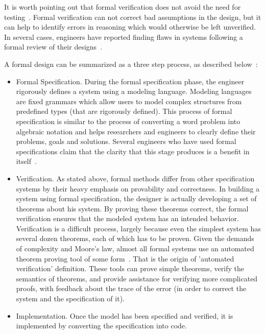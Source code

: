 It is worth pointing out that formal verification does not avoid the need for testing~\cite{Bowen95}. Formal verification can not correct bad assumptions in the design, but it can help to identify errors in reasoning which would otherwise be left unverified. In several cases, engineers have reported finding flaws in systems following a formal review of their designs~\cite{Kling95}.

A formal design can be summarized as a three step process, as described below~\cite{Collins98}:

\begin{itemize}
\item Formal Specification. During the formal specification phase, the engineer rigorously defines a system using a modeling language. Modeling languages are fixed grammars which allow users to model complex structures from predefined types (that are rigorously defined). This process of formal specification is similar to the process of converting a word problem into algebraic notation and helps researchers and engineers to clearly define their problems, goals and solutions. Several engineers who have used formal specifications claim that the clarity that this stage produces is a benefit in itself~\cite{Kling95}.
\item Verification. As stated above, formal methods differ from other specification systems by their heavy emphasis on provability and correctness. In building a system using formal specification, the designer is actually developing a set of theorems about his system. By proving these theorems correct, the formal verification ensures that the modeled system has an intended behavior. Verification is a difficult process, largely because even the simplest system has several dozen theorems, each of which has to be proven. Given the demands of complexity and Moore's law, almost all formal systems use an automated theorem proving tool of some form~\cite{Collins98}. That is the origin of 'automated verification' definition. These tools can prove simple theorems, verify the semantics of theorems, and provide assistance for verifying more complicated proofs, with feedback about the trace of the error (in order to correct the system and the specification of it).
\item Implementation. Once the model has been specified and verified, it is implemented by converting the specification into code.

\end{itemize}

